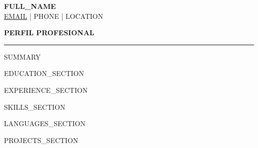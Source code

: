 \documentclass[letterpaper,11pt]{article}
\newcommand{\resumesection}[1]{
    \vspace{0.7em}
    {\color{accent}\textbf{\large #1}}
    \vspace{0.2em}
    {\color{accent}\hrule}
    \vspace{0.55em}
}
\begin{document}
\begin{center}
    {\Huge \textbf{\textcolor{primary}{{{FULL_NAME}}}}} \\[0.4em]
    {\small
    \href{mailto:{{EMAIL}}}{{{EMAIL}}}
    \quad | \quad
    {{PHONE}}
    \quad | \quad
    {{LOCATION}}
    }
\end{center}

\vspace{0.4em}

\resumesection{PERFIL PROFESIONAL}

{{SUMMARY}}

{{EDUCATION_SECTION}}

{{EXPERIENCE_SECTION}}

{{SKILLS_SECTION}}

{{LANGUAGES_SECTION}}

{{PROJECTS_SECTION}}
\end{document}
